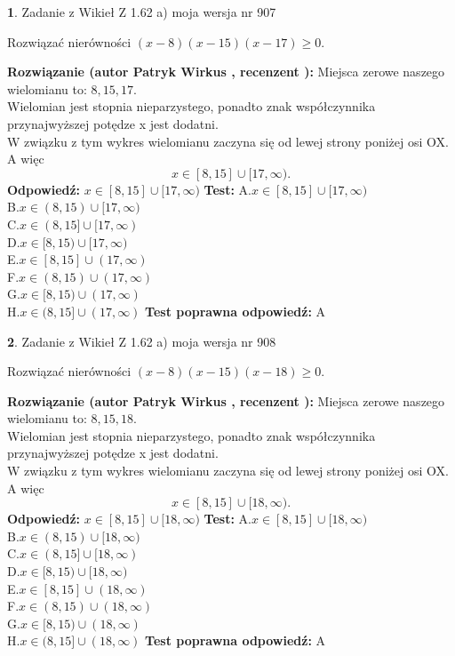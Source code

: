 \documentclass[12pt, a4paper]{article}
\theoremstyle{definition} %
\newtheorem{zad}{}
\newcommand{\zadStart}[1]{\begin{zad}#1\newline}
\newcommand{\zadStop}{\end{zad}}
\newcommand{\rozwStart}[2]{\noindent \textbf{Rozwiązanie (autor #1 , recenzent #2): }\newline}
\newcommand{\rozwStop}{\newline}
\newcommand{\odpStart}{\noindent \textbf{Odpowiedź:}\newline}
\newcommand{\odpStop}{\newline}
\newcommand{\testStart}{\noindent \textbf{Test:}\newline}
\newcommand{\testStop}{\newline}
\newcommand{\kluczStart}{\noindent \textbf{Test poprawna odpowiedź:}\newline}
\newcommand{\kluczStop}{\newline}
\begin{document}
\zadStart{Zadanie z Wikieł Z 1.62 a) moja wersja nr 907}

Rozwiązać nierówności $(x-8)(x-15)(x-17)\ge0$.
\zadStop
\rozwStart{Patryk Wirkus}{}
Miejsca zerowe naszego wielomianu to: $8, 15, 17$.\\
Wielomian jest stopnia nieparzystego, ponadto znak współczynnika przy\linebreak najwyższej potędze x jest dodatni.\\ W związku z tym wykres wielomianu zaczyna się od lewej strony poniżej osi OX. A więc $$x \in [8,15] \cup [17,\infty).$$
\rozwStop
\odpStart
$x \in [8,15] \cup [17,\infty)$
\odpStop
\testStart
A.$x \in [8,15] \cup [17,\infty)$\\
B.$x \in (8,15) \cup [17,\infty)$\\
C.$x \in (8,15] \cup [17,\infty)$\\
D.$x \in [8,15) \cup [17,\infty)$\\
E.$x \in [8,15] \cup (17,\infty)$\\
F.$x \in (8,15) \cup (17,\infty)$\\
G.$x \in [8,15) \cup (17,\infty)$\\
H.$x \in (8,15] \cup (17,\infty)$
\testStop
\kluczStart
A
\kluczStop



\zadStart{Zadanie z Wikieł Z 1.62 a) moja wersja nr 908}

Rozwiązać nierówności $(x-8)(x-15)(x-18)\ge0$.
\zadStop
\rozwStart{Patryk Wirkus}{}
Miejsca zerowe naszego wielomianu to: $8, 15, 18$.\\
Wielomian jest stopnia nieparzystego, ponadto znak współczynnika przy\linebreak najwyższej potędze x jest dodatni.\\ W związku z tym wykres wielomianu zaczyna się od lewej strony poniżej osi OX. A więc $$x \in [8,15] \cup [18,\infty).$$
\rozwStop
\odpStart
$x \in [8,15] \cup [18,\infty)$
\odpStop
\testStart
A.$x \in [8,15] \cup [18,\infty)$\\
B.$x \in (8,15) \cup [18,\infty)$\\
C.$x \in (8,15] \cup [18,\infty)$\\
D.$x \in [8,15) \cup [18,\infty)$\\
E.$x \in [8,15] \cup (18,\infty)$\\
F.$x \in (8,15) \cup (18,\infty)$\\
G.$x \in [8,15) \cup (18,\infty)$\\
H.$x \in (8,15] \cup (18,\infty)$
\testStop
\kluczStart
A
\kluczStop
\end{document}

